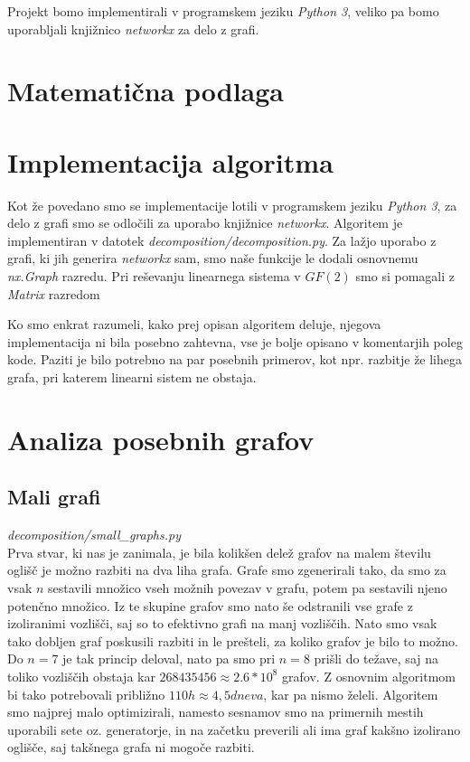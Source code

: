 \documentclass[12pt,a4paper]{amsart}
\theoremstyle{definition} %
\theoremstyle{plain} %
\begin{document}
Projekt bomo implementirali v programskem jeziku \emph{Python 3}, veliko pa bomo uporabljali knjižnico \emph{networkx} za delo z grafi.

\section{Matematična podlaga}



\section{Implementacija algoritma}
Kot že povedano smo se implementacije lotili v programskem jeziku \emph{Python 3}, za delo z grafi smo se odločili za uporabo knjižnice \emph{networkx}.
Algoritem je implementiran v datotek \emph{decomposition/decomposition.py}. Za lažjo uporabo z grafi, ki jih generira \emph{networkx} sam, smo naše funkcije
le dodali osnovnemu \emph{nx.Graph} razredu.
Pri reševanju linearnega sistema v $GF(2)$ smo si pomagali z \emph{Matrix} razredom %

Ko smo enkrat razumeli, kako prej opisan algoritem deluje, njegova implementacija ni bila posebno zahtevna, vse je bolje opisano v komentarjih poleg kode.
Paziti je bilo potrebno na par posebnih primerov, kot npr. razbitje že lihega grafa, pri katerem linearni sistem ne obstaja.

\section{Analiza posebnih grafov}

\subsection{Mali grafi}
\emph{decomposition/small\_graphs.py}
\\

Prva stvar, ki nas je zanimala, je bila kolikšen delež grafov na malem številu oglišč je možno razbiti na dva liha grafa.
Grafe smo zgenerirali tako, da smo za vsak $n$ sestavili množico vseh možnih povezav v grafu, potem pa sestavili njeno potenčno množico.
Iz te skupine grafov smo nato še odstranili vse grafe z izoliranimi vozlišči, saj so to efektivno grafi na manj vozliščih.
Nato smo vsak tako dobljen graf poskusili razbiti in le prešteli, za koliko grafov je bilo to možno.
\\

Do $n=7$ je tak princip deloval, nato pa smo pri $n=8$ prišli do težave, saj na toliko vozliščih obstaja kar $268435456 \approx 2.6 * 10^8$ grafov.
Z osnovnim algoritmom bi tako potrebovali približno $110h \approx 4,5 dneva$, kar pa nismo želeli. Algoritem smo najprej malo optimizirali, namesto sesnamov smo
na primernih mestih uporabili sete oz. generatorje, in na začetku preverili ali ima graf kakšno izolirano oglišče, saj takšnega grafa ni mogoče razbiti.
\\
\end{document}
